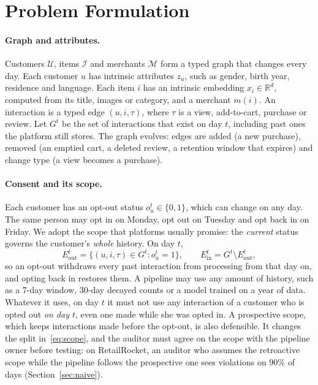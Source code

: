 \documentclass[10pt,twocolumn,letterpaper]{article}
\theoremstyle{definition}
\newcommand{\Ein}{E_{\mathrm{in}}}
\newcommand{\Eout}{E_{\mathrm{out}}}
\begin{document}
\section{Problem Formulation}\label{sec:problem}
\paragraph{Graph and attributes.}
Customers $\mathcal{U}$, items $\mathcal{I}$ and merchants $\mathcal{M}$ form a
typed graph that changes every day. Each customer $u$ has intrinsic attributes
$z_u$, such as gender, birth year, residence and language. Each item $i$ has an
intrinsic embedding $x_i\in\mathbb{R}^d$, computed from its title, images or
category, and a merchant $m(i)$. An interaction is a typed edge $(u,i,\tau)$, where
$\tau$ is a view, add-to-cart, purchase or review. Let $G^t$ be the set of
interactions that exist on day $t$, including past ones the platform still
stores. The graph evolves: edges are added (a new purchase), removed (an
emptied cart, a deleted review, a retention window that expires) and change
type (a view becomes a purchase).

\paragraph{Consent and its scope.}
Each customer has an opt-out status $o_u^t\in\{0,1\}$, which can change on any
day. The same person may opt in on Monday, opt out on Tuesday and opt back in
on Friday. We adopt the scope that platforms usually promise: the
\emph{current} status governs the customer's \emph{whole} history. On day $t$,
\begin{equation}
  \Eout^t=\{(u,i,\tau)\in G^t: o_u^t=1\},\qquad \Ein^t=G^t\setminus\Eout^t,
  \label{eq:scope}
\end{equation}
so an opt-out withdraws every past interaction from processing from that day
on, and opting back in restores them. A pipeline may use any amount of
history, such as a 7-day window, 30-day decayed counts or a model trained on a
year of data. Whatever it uses, on day $t$ it must not use any interaction of a
customer who is opted out \emph{on day $t$}, even one made while she was opted
in. A prospective scope, which keeps interactions made before the opt-out, is
also defensible. It changes the split in~\eqref{eq:scope}, and the auditor must
agree on the scope with the pipeline owner before testing: on RetailRocket,
an auditor who assumes the retroactive scope while the pipeline follows the
prospective one sees violations on 90\% of days (Section~\ref{sec:naive}).
\end{document}
